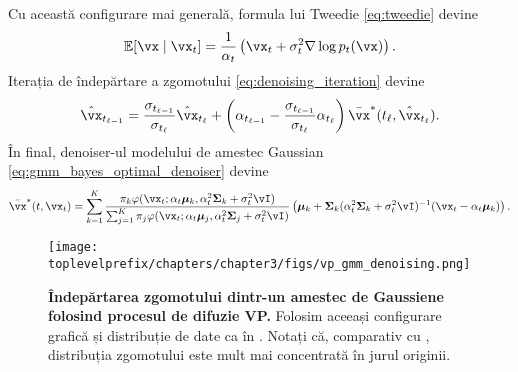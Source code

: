 \documentclass[../../book-main_ro.tex]{subfiles}
\begin{document}
Cu această configurare mai generală, formula lui Tweedie \eqref{eq:tweedie} devine 
\begin{equation}\label{eq:gen_tweedie}
	\Ex[\vx \mid \vx_{t}] = \frac{1}{\alpha_{t}}\bp{\vx_{t} + \sigma_{t}^{2}\nabla \log p_{t}(\vx)}.
\end{equation}
Iterația de îndepărtare a zgomotului \eqref{eq:denoising_iteration} devine
\begin{equation}\label{eq:gen_denoising_iteration}
	\hat{\vx}_{t_{\ell - 1}} = \frac{\sigma_{t_{\ell - 1}}}{\sigma_{t_{\ell}}}\hat{\vx}_{t_{\ell}} + \bp{\alpha_{t_{\ell - 1}} - \frac{\sigma_{t_{\ell - 1}}}{\sigma_{t_{\ell}}}\alpha_{t_{\ell}}}\bar{\vx}^{\ast}(t_{\ell}, \hat{\vx}_{t_{\ell}}).
\end{equation}
În final, denoiser-ul modelului de amestec Gaussian \eqref{eq:gmm_bayes_optimal_denoiser} devine 
\begin{equation}\label{eq:gen_gmm_bayes_optimal_denoiser}
	\bar{\vx}^{\ast}(t, \vx_{t}) = \sum_{k = 1}^{K}\frac{\pi_{k}\phi(\vx_{t} ; \alpha_{t}\boldsymbol{\mu}_{k}, \alpha_{t}^{2}\boldsymbol{\Sigma}_{k} + \sigma_{t}^{2}\vI)}{\sum_{j = 1}^{K}\pi_{j}\phi(\vx_{t} ; \alpha_{t}\boldsymbol{\mu}_{j}, \alpha_{t}^{2}\boldsymbol{\Sigma}_{j} + \sigma_{t}^{2}\vI)}\bp{\boldsymbol{\mu}_{k} + \boldsymbol{\Sigma}_{k}(\alpha_{t}^{2}\boldsymbol{\Sigma}_{k} + \sigma_{t}^{2}\vI)^{-1}(\vx_{t} - \alpha_{t}\boldsymbol{\mu}_{k})}.
\end{equation}

\begin{figure}[!htbp]
	\centering 
	\texttt{[image: \\toplevelprefix/chapters/chapter3/figs/vp\_gmm\_denoising.png]}
	\caption{\small\textbf{Îndepărtarea zgomotului dintr-un amestec de Gaussiene folosind procesul de difuzie VP.} Folosim aceeași configurare grafică și distribuție de date ca în . Notați că, comparativ cu , distribuția zgomotului este mult mai concentrată în jurul originii.}
	\label{fig:vp_gmm_denoising}
\end{figure}
\end{document}
